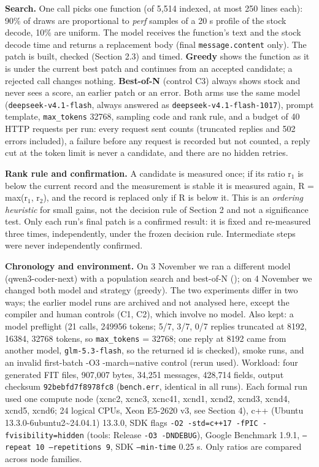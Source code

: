 \documentclass[10pt,a4paper]{article}
\begin{document}
\textbf{Search.} One call picks one function (of 5,514 indexed, at most 250 lines each): 90\% of draws are proportional to \emph{perf} samples of a 20 s profile of the stock decode, 10\% are uniform. The model receives the function's text and the stock decode time and returns a replacement body (final \texttt{message.content} only). The patch is built, checked (Section 2.3) and timed. \textbf{Greedy} shows the function as it is under the current best patch and continues from an accepted candidate; a rejected call changes nothing. \textbf{Best-of-N} (control C3) always shows stock and never sees a score, an earlier patch or an error. Both arms use the same model (\texttt{deepseek-v4.1-flash}, always answered as \texttt{deepseek-v4.1-flash-1017}), prompt template, \texttt{max\_tokens} 32768, sampling code and rank rule, and a budget of 40 HTTP requests per run: every request sent counts (truncated replies and 502 errors included), a failure before any request is recorded but not counted, a reply cut at the token limit is never a candidate, and there are no hidden retries.

\textbf{Rank rule and confirmation.} A candidate is measured once; if its ratio r$_1$ is below the current record and the measurement is stable it is measured again, R = max(r$_1$, r$_2$), and the record is replaced only if R is below it. This is an \emph{ordering heuristic} for small gains, not the decision rule of Section 2 and not a significance test. Only each run's final patch is a confirmed result: it is fixed and re-measured three times, independently, under the frozen decision rule. Intermediate steps were never independently confirmed.

\textbf{Chronology and environment.} On 3 November we ran a different model (qwen3-coder-next) with a population search and best-of-N (); on 4 November we changed both model and strategy (greedy). The two experiments differ in two ways; the earlier model runs are archived and not analysed here, except the compiler and human controls (C1, C2), which involve no model. Also kept: a model preflight (21 calls, 249956 tokens; 5/7, 3/7, 0/7 replies truncated at 8192, 16384, 32768 tokens, so \texttt{max\_tokens} = 32768; one reply at 8192 came from another model, \texttt{glm-5.3-flash}, so the returned id is checked), smoke runs, and an invalid first-batch -O3 -march=native control (rerun used). Workload: four generated FIT files, 907,007 bytes, 34,251 messages, 428,714 fields, output checksum \texttt{92bebfd7f8978fc8} (\texttt{bench.err}, identical in all runs). Each formal run used one compute node (xcnc2, xcnc3, xcnc41, xcnd1, xcnd2, xcnd3, xcnd4, xcnd5, xcnd6; 24 logical CPUs, Xeon E5-2620 v3, see Section 4), c++ (Ubuntu 13.3.0-6ubuntu2\textasciitilde{}24.04.1) 13.3.0, SDK flags \texttt{-O2 -std=c++17 -fPIC -fvisibility=hidden} (tools: Release \texttt{-O3 -DNDEBUG}), Google Benchmark 1.9.1, \texttt{--repeat 10 --repetitions 9}, SDK \texttt{--min-time} 0.25 s. Only ratios are compared across node families.
\end{document}
